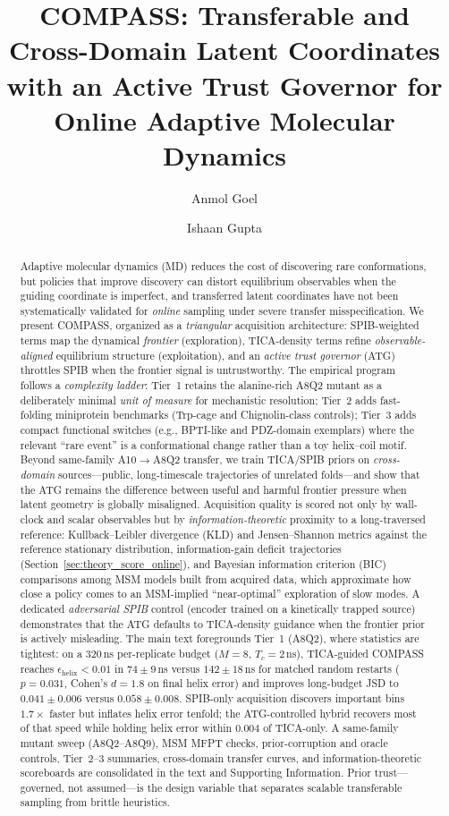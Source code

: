 \documentclass[journal=jctcce,manuscript=article,layout=twocolumn]{achemso}
\title{COMPASS: Transferable and Cross-Domain Latent Coordinates with an Active Trust Governor for Online Adaptive Molecular Dynamics}
\author{Anmol Goel}
\affiliation{Department of Biochemical Engineering and Biotechnology, Indian Institute of Technology Delhi, New Delhi 110016, India}
\author{Ishaan Gupta}
\affiliation{Department of Biochemical Engineering and Biotechnology, Indian Institute of Technology Delhi, New Delhi 110016, India}
\begin{document}

\begin{abstract}
Adaptive molecular dynamics (MD) reduces the cost of discovering rare conformations, but policies that improve discovery can distort equilibrium observables when the guiding coordinate is imperfect, and transferred latent coordinates have not been systematically validated for \emph{online} sampling under severe transfer misspecification. We present COMPASS, organized as a \emph{triangular} acquisition architecture: SPIB-weighted terms map the dynamical \emph{frontier} (exploration), TICA-density terms refine \emph{observable-aligned} equilibrium structure (exploitation), and an \emph{active trust governor} (ATG) throttles SPIB when the frontier signal is untrustworthy. The empirical program follows a \emph{complexity ladder}: Tier~1 retains the alanine-rich A8Q2 mutant as a deliberately minimal \emph{unit of measure} for mechanistic resolution; Tier~2 adds fast-folding miniprotein benchmarks (Trp-cage and Chignolin-class controls); Tier~3 adds compact functional switches (e.g., BPTI-like and PDZ-domain exemplars) where the relevant ``rare event'' is a conformational change rather than a toy helix--coil motif. Beyond same-family A10$\to$A8Q2 transfer, we train TICA/SPIB priors on \emph{cross-domain} sources---public, long-timescale trajectories of unrelated folds---and show that the ATG remains the difference between useful and harmful frontier pressure when latent geometry is globally misaligned. Acquisition quality is scored not only by wall-clock and scalar observables but by \emph{information-theoretic} proximity to a long-traversed reference: Kullback--Leibler divergence (KLD) and Jensen--Shannon metrics against the reference stationary distribution, information-gain deficit trajectories (Section~\ref{sec:theory_score_online}), and Bayesian information criterion (BIC) comparisons among MSM models built from acquired data, which approximate how close a policy comes to an MSM-implied ``near-optimal'' exploration of slow modes. A dedicated \emph{adversarial SPIB} control (encoder trained on a kinetically trapped source) demonstrates that the ATG defaults to TICA-density guidance when the frontier prior is actively misleading. The main text foregrounds Tier~1 (A8Q2), where statistics are tightest: on a $320$\,ns per-replicate budget ($M=8$, $T_c=2$\,ns), TICA-guided COMPASS reaches $\epsilon_{\mathrm{helix}}<0.01$ in $74\pm 9$\,ns versus $142\pm 18$\,ns for matched random restarts ($p=0.031$, Cohen's $d=1.8$ on final helix error) and improves long-budget JSD to $0.041\pm 0.006$ versus $0.058\pm 0.008$. SPIB-only acquisition discovers important bins $1.7\times$ faster but inflates helix error tenfold; the ATG-controlled hybrid recovers most of that speed while holding helix error within $0.004$ of TICA-only. A same-family mutant sweep (A8Q2--A8Q9), MSM MFPT checks, prior-corruption and oracle controls, Tier~2--3 summaries, cross-domain transfer curves, and information-theoretic scoreboards are consolidated in the text and Supporting Information. Prior trust---governed, not assumed---is the design variable that separates scalable transferable sampling from brittle heuristics.
\end{abstract}
\end{document}
